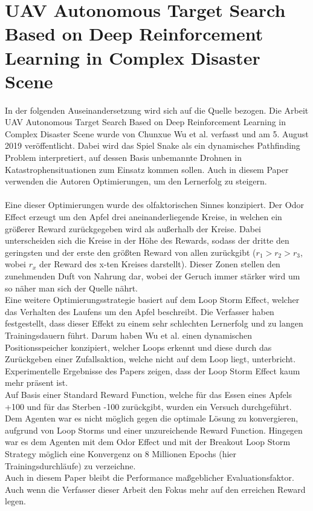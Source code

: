 \section{UAV Autonomous Target Search Based on Deep Reinforcement Learning in Complex Disaster Scene} \label{sec:Paper_2}
In der folgenden Auseinandersetzung wird sich auf die Quelle \cite{UAV} bezogen.
Die Arbeit UAV Autonomous Target Search Based on Deep Reinforcement Learning in Complex Disaster Scene wurde von Chunxue Wu et al. verfasst und am 5. August 2019 veröffentlicht. Dabei wird das Spiel Snake als ein dynamisches Pathfinding Problem interpretiert, auf dessen Basis unbemannte Drohnen in Katastrophensituationen zum Einsatz kommen sollen. Auch in diesem Paper verwenden die Autoren Optimierungen, um den Lernerfolg zu steigern.\\
\\ Eine dieser Optimierungen wurde des olfaktorischen Sinnes konzipiert. Der Odor Effect erzeugt um den Apfel drei aneinanderliegende Kreise, in welchen ein größerer Reward zurückgegeben wird als außerhalb der Kreise. Dabei unterscheiden sich die Kreise in der Höhe des Rewards, sodass der dritte den geringsten und der erste den größten Reward von allen zurückgibt ($r_1 > r_2 > r_3$, wobei $r_x$ der Reward des x-ten Kreises darstellt). Dieser Zonen stellen den zunehmenden Duft von Nahrung dar, wobei der Geruch immer stärker wird um so näher man sich der Quelle nährt.\\
Eine weitere Optimierungsstrategie basiert auf dem Loop Storm Effect, welcher das Verhalten des Laufens um den Apfel beschreibt. Die Verfasser haben festgestellt, dass dieser Effekt zu einem sehr schlechten Lernerfolg und zu langen Trainingsdauern führt. Darum haben Wu et al. einen dynamischen Positionsspeicher konzipiert, welcher Loops erkennt und diese durch das Zurückgeben einer Zufallsaktion, welche nicht auf dem Loop liegt, unterbricht. Experimentelle Ergebnisse des Papers zeigen, dass der Loop Storm Effect kaum mehr präsent ist.
\\ Auf Basis einer Standard Reward Function, welche für das Essen eines Apfels +100 und für das Sterben -100 zurückgibt, wurden ein Versuch durchgeführt. Dem Agenten war es nicht möglich gegen die optimale Lösung zu konvergieren, aufgrund von Loop Storms und einer unzureichende Reward Function. Hingegen war es dem Agenten mit dem Odor Effect und mit der Breakout Loop Storm Strategy möglich eine Konvergenz on 8 Millionen Epochs (hier Trainingsdurchläufe) zu verzeichne.\\
Auch in diesem Paper bleibt die Performance maßgeblicher Evaluationsfaktor. Auch wenn die Verfasser dieser Arbeit den Fokus mehr auf den erreichen Reward legen.

